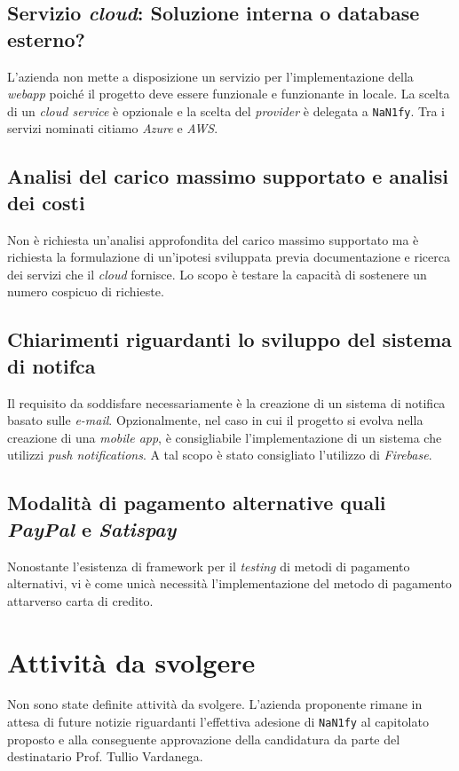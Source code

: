\subsection{Servizio \textit{cloud}: Soluzione interna o database esterno?}
    L'azienda non mette a disposizione un servizio per l'implementazione della \textit{webapp} poiché il progetto deve essere funzionale e funzionante in locale. La scelta di un \textit{cloud service} è opzionale e la scelta del \textit{provider} è delegata a \texttt{NaN1fy}. Tra i servizi nominati citiamo \textit{Azure} e \textit{AWS}.
\subsection{Analisi del carico massimo supportato e analisi dei costi}
    Non è richiesta un'analisi approfondita del carico massimo supportato ma è richiesta la formulazione di un'ipotesi sviluppata previa documentazione e ricerca dei servizi che il \textit{cloud} fornisce.
    Lo scopo è testare la capacità di sostenere un numero cospicuo di richieste.
\subsection{Chiarimenti riguardanti lo sviluppo del sistema di notifca}
    Il requisito da soddisfare necessariamente è la creazione di un sistema di notifica basato sulle \textit{e-mail}. Opzionalmente, nel caso in cui il progetto si evolva nella creazione di una \textit{mobile app}, è consigliabile l'implementazione di un sistema che utilizzi \textit{push notifications}. A tal scopo è stato consigliato l'utilizzo di \textit{Firebase}.
\subsection{Modalità di pagamento alternative quali \textit{PayPal} e \textit{Satispay}}
    Nonostante l'esistenza di framework per il \textit{testing} di metodi di pagamento alternativi, vi è come unicà necessità l'implementazione del metodo di pagamento attarverso carta di credito.
\section{Attività da svolgere}
    Non sono state definite attività da svolgere. L'azienda proponente rimane in attesa di future notizie riguardanti l'effettiva adesione di \texttt{NaN1fy} al capitolato proposto e alla conseguente approvazione della candidatura da parte del destinatario Prof. Tullio Vardanega.
\\\\

